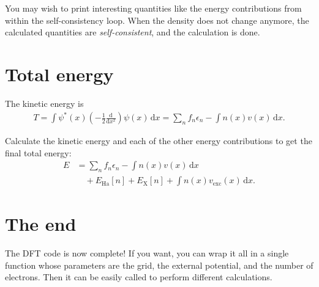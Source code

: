 \documentclass{article}
\newcommand{\exercise}[1]{
  \bigskip
  \begin{boxedminipage}[c]{0.8\linewidth}
  #1
  \end{boxedminipage}
  \bigskip
}
\newcommand{\dee}[0]{\mathrm d}
\newcommand{\idee}[0]{\,\dee}
\newcommand{\diff}[2]{\frac{\dee #1}{\dee #2}}
\newcommand{\Ha}[0]{\mathrm{Ha}}
\newcommand{\X}[0]{\mathrm{X}}
\begin{document}
\noindent You may wish to print interesting quantities like the energy
contributions from within the self-consistency loop.
When the
density does not change anymore, the calculated quantities are
\emph{self-consistent}, and the calculation is done.

\section{Total energy}
The kinetic energy is
\begin{align}
  T = \int \psi^*(x)\left(-\frac12 \diff{}{x^2}\right) \psi(x) \idee x
  = \sum_n f_n \epsilon_n - \int n(x) v(x) \idee x.
\end{align}

\exercise{
Calculate the kinetic energy and each of the other energy contributions to get the final total energy:
\begin{align}
  E &= \sum_n f_n \epsilon_n - \int n(x) v(x) \idee x \nonumber\\
  &\quad+ E_\Ha[n] + E_\X[n] + \int n(x) v_{\mathrm{exc}}(x) \idee x.
\end{align}
}

\section{The end}

The DFT code is now complete!  If you want, you can wrap it all in a
single function whose parameters are the grid, the external potential,
and the number of electrons.  Then it can be easily called to perform
different calculations.
\end{document}
